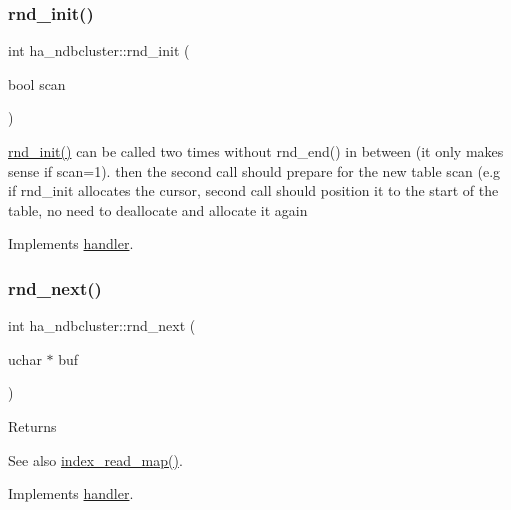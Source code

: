 \subsubsection{\texorpdfstring{rnd\+\_\+init()}{rnd\_init()}}
{\footnotesize\ttfamily int ha\+\_\+ndbcluster\+::rnd\+\_\+init (\begin{DoxyParamCaption}\item[{bool}]{scan }\end{DoxyParamCaption})\hspace{0.3cm}{\ttfamily [virtual]}}

\mbox{\hyperlink{classha__ndbcluster_acb923144766720049d59f97cd70286fd}{rnd\+\_\+init()}} can be called two times without rnd\+\_\+end() in between (it only makes sense if scan=1). then the second call should prepare for the new table scan (e.\+g if rnd\+\_\+init allocates the cursor, second call should position it to the start of the table, no need to deallocate and allocate it again 

Implements \mbox{\hyperlink{classhandler}{handler}}.

\mbox{\label{classha__ndbcluster_adc93bae43a800cc5ba5057b306136de1}} 
\subsubsection{\texorpdfstring{rnd\+\_\+next()}{rnd\_next()}}
{\footnotesize\ttfamily int ha\+\_\+ndbcluster\+::rnd\+\_\+next (\begin{DoxyParamCaption}\item[{uchar $\ast$}]{buf }\end{DoxyParamCaption})\hspace{0.3cm}{\ttfamily [virtual]}}

\begin{DoxyReturn}{Returns}

\end{DoxyReturn}
\begin{DoxySeeAlso}{See also}
\mbox{\hyperlink{classhandler_af8c2b258691e5baac8dd22d19c084b37}{index\+\_\+read\+\_\+map()}}. 
\end{DoxySeeAlso}


Implements \mbox{\hyperlink{classhandler_a48cb9c94ca93dbfbb7e92822caba82a1}{handler}}.

\mbox{\label{classha__ndbcluster_a8980053ce56e386ced321a1ad88d1cc2}} 
